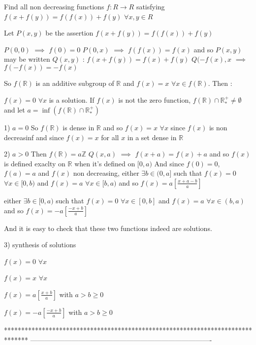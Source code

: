 \begin{solution}
	\begin{tcolorbox}Find all non decreasing functions $ f: R\to R$ satisfying $ f(x + f(y)) = f(f(x)) + f(y)$ $ \forall x,y \in R$\end{tcolorbox}

Let $ P(x,y)$ be the assertion $ f(x + f(y)) = f(f(x)) + f(y)$

$ P(0,0)$ $ \implies$ $ f(0) = 0$
$ P(0,x)$ $ \implies$ $ f(f(x)) = f(x)$ and so $ P(x,y)$ may be written $ Q(x,y)$ : $ f(x + f(y)) = f(x) + f(y)$
$ Q( - f(x),x$ $ \implies$ $ f( - f(x)) = - f(x)$

So $ f(\mathbb R)$ is an additive subgroup of $ \mathbb R$ and $ f(x) = x$ $ \forall x\in f(\mathbb R)$. Then :

$ f(x) = 0$ $ \forall x$ is a solution.
If $ f(x)$ is not the zero function, $ f(\mathbb R)\cap\mathbb R^ + _*\ne \emptyset$ and let $ a = \inf (f(\mathbb R)\cap \mathbb R^ + _*)$

1) $ a = 0$
So $ f(\mathbb R)$ is dense in $ \mathbb R$ and so $ f(x) = x$ $ \forall x$ since $ f(x)$ is non decreasinf and since $ f(x) = x$ for all $ x$ in a set dense in $ \mathbb R$

2) $ a > 0$
Then $ f(\mathbb R) = a\mathbb Z$
$ Q(x,a)$ $ \implies$ $ f(x + a) = f(x) + a$ and so $ f(x)$ is defined exaclty on $ \mathbb R$ when it's defined on $ [0,a)$
And since $ f(0) = 0$, $ f(a) = a$ and $ f(x)$ non decreasing, 
either $ \exists b\in(0,a]$ such that $ f(x) = 0$ $ \forall x\in[0,b)$ and $ f(x) = a$ $ \forall x\in[b,a)$ and so $ f(x) = a[\frac {x + a - b}a]$

either $ \exists b\in[0,a)$ such that $ f(x) = 0$ $ \forall x\in[0,b]$ and $ f(x) = a$ $ \forall x\in(b,a)$ and so $ f(x) = -a[\frac { - x + b}a]$

And it is easy to check that these two functions indeed are solutions.

3) synthesis of solutions

$ f(x) = 0$ $ \forall x$

$ f(x) = x$ $ \forall x$

$ f(x) = a[\frac {x + b}a]$ with $ a > b \ge 0$

$ f(x) = -a[\frac { - x + b}a]$ with $ a > b \ge 0$
\end{solution}
*******************************************************************************
-------------------------------------------------------------------------------

